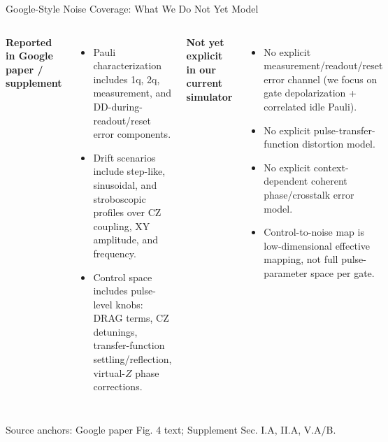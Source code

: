 \documentclass[10pt,aspectratio=169]{beamer}
\begin{document}
\begin{frame}{Google-Style Noise Coverage: What We Do Not Yet Model}
  \small
  \begin{columns}[T,onlytextwidth]
    \textbf{Reported in Google paper / supplement}
    \begin{itemize}
      \item Pauli characterization includes 1q, 2q, measurement, and DD-during-readout/reset error components.
      \item Drift scenarios include step-like, sinusoidal, and stroboscopic profiles over CZ coupling, XY amplitude, and frequency.
      \item Control space includes pulse-level knobs: DRAG terms, CZ detunings, transfer-function settling/reflection, virtual-\(Z\) phase corrections.
    \end{itemize}
    \textbf{Not yet explicit in our current simulator}
    \begin{itemize}
      \item No explicit measurement/readout/reset error channel (we focus on gate depolarization + correlated idle Pauli).
      \item No explicit pulse-transfer-function distortion model.
      \item No explicit context-dependent coherent phase/crosstalk error model.
      \item Control-to-noise map is low-dimensional effective mapping, not full pulse-parameter space per gate.
    \end{itemize}
  \end{columns}
  \vspace{0.25em}
  \tiny
  Source anchors: Google paper Fig. 4 text; Supplement Sec. I.A, II.A, V.A/B.
\end{frame}
\end{document}
